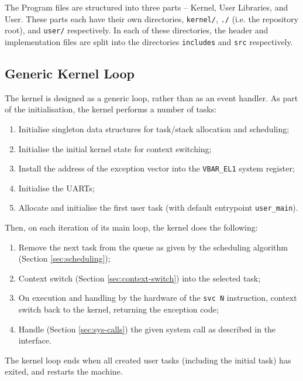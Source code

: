 \documentclass[12pt]{article}
\begin{document}
    The Program files are structured into three parts -- Kernel, User Libraries, and User. These parts each have their own directories, \verb`kernel/`, \verb`./` (i.e. the repository root), and \verb`user/` respectively. In each of these directories, the header and implementation files are split into the directories \verb`includes` and \verb`src` respectively.

    \subsection{Generic Kernel Loop}
    \label{sec:main}

    The kernel is designed as a generic loop, rather than as an event handler. As part of the initialisation, the kernel performs a number of tasks:
    \begin{enumerate}[(1)]
        \item Initialise singleton data structures for task/stack allocation and scheduling;
        \item Initialise the initial kernel state for context switching;
        \item Install the address of the exception vector into the \verb`VBAR_EL1` system register;
        \item Initialise the UARTs;
        \item Allocate and initialise the first user task (with default entrypoint \verb`user_main`).
    \end{enumerate}

    Then, on each iteration of its main loop, the kernel does the following:
    \begin{enumerate}[(1)]
        \item Remove the next task from the queue as given by the scheduling algorithm (Section \ref{sec:scheduling});
        \item Context switch (Section \ref{sec:context-switch}) into the selected task;
        \item On execution and handling by the hardware of the \verb`svc N` instruction, context switch back to the kernel, returning the exception code;
        \item Handle (Section \ref{sec:sys-calls}) the given system call as described in the interface.
    \end{enumerate}

    The kernel loop ends when all created user tasks (including the initial task) has exited, and restarts the machine.
\end{document}
